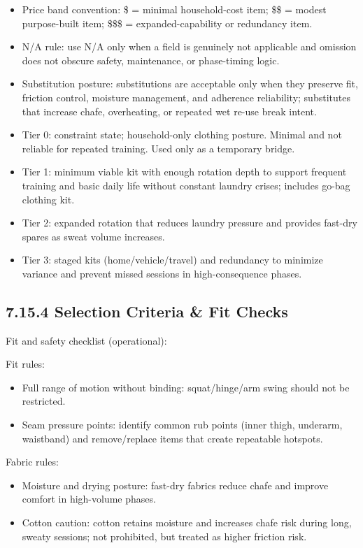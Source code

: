 \documentclass[10pt]{article}
\begin{document}
\begin{itemize}
\item Price band convention: \$ = minimal household-cost item; \$\$ = modest purpose-built item; \$\$\$ = expanded-capability or redundancy item.
\item N/A rule: use N/A only when a field is genuinely not applicable and omission does not obscure safety, maintenance, or phase-timing logic.
\item Substitution posture: substitutions are acceptable only when they preserve fit, friction control, moisture management, and adherence reliability; substitutes that increase chafe, overheating, or repeated wet re-use break intent.
\item Tier 0: constraint state; household-only clothing posture. Minimal and not reliable for repeated training. Used only as a temporary bridge.
\item Tier 1: minimum viable kit with enough rotation depth to support frequent training and basic daily life without constant laundry crises; includes go-bag clothing kit.
\item Tier 2: expanded rotation that reduces laundry pressure and provides fast-dry spares as sweat volume increases.
\item Tier 3: staged kits (home/vehicle/travel) and redundancy to minimize variance and prevent missed sessions in high-consequence phases.
\end{itemize}

\subsection*{7.15.4 Selection Criteria \& Fit Checks}
{}

Fit and safety checklist (operational):

Fit rules:

\begin{itemize}
\item Full range of motion without binding: squat/hinge/arm swing should not be restricted.
\item Seam pressure points: identify common rub points (inner thigh, underarm, waistband) and remove/replace items that create repeatable hotspots.
\end{itemize}

Fabric rules:

\begin{itemize}
\item Moisture and drying posture: fast-dry fabrics reduce chafe and improve comfort in high-volume phases.
\item Cotton caution: cotton retains moisture and increases chafe risk during long, sweaty sessions; not prohibited, but treated as higher friction risk.
\end{itemize}
\end{document}
